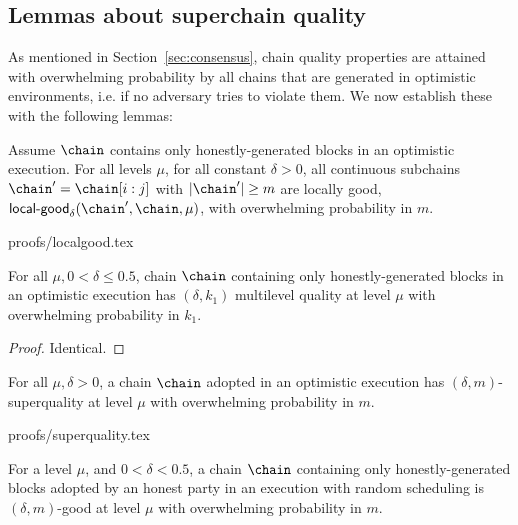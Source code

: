 \subsection{Lemmas about superchain quality}
\label{sec:consensus-full}

As mentioned in Section~\ref{sec:consensus}, chain quality properties are attained
with overwhelming probability by all chains that are generated in optimistic
environments, i.e. if no adversary tries to violate them.
We now establish these with the following lemmas:

\begin{lemma}
\label{lem.localgood}
Assume $\chain$ contains only honestly-generated blocks in an optimistic
execution. For all levels $\mu$, for all constant $\delta > 0$, all continuous
subchains $\chain' = \chain[i:j]$ with $|\chain'| \geq m$ are locally good,
$\textsf{local-good}_{\delta}(\chain', \chain, \mu)$, with overwhelming
probability in $m$.
\end{lemma}
{proofs/localgood.tex}

\begin{lemma}\label{lem.multilevel}
For all $\mu, 0 < \delta \leq 0.5$, chain $\chain$ containing only
honestly-generated blocks in an optimistic execution has $(\delta, k_1)$
multilevel quality at level $\mu$ with overwhelming probability in $k_1$.
\end{lemma}
\begin{proof}
Identical.
\Qed
\end{proof}

\begin{lemma}[Superquality]
\label{lem.superquality}
For all $\mu, \delta > 0$, a chain $\chain$ adopted in an optimistic execution
has $(\delta, m)$-superquality at level $\mu$ with overwhelming probability in
$m$.
\end{lemma}
{proofs/superquality.tex}

\begin{lemma}
\label{lem.superchain-distribution}
For a level $\mu$, and $0 < \delta < 0.5$, a chain
$\chain$ containing only honestly-generated blocks adopted by an honest party in
an execution with random scheduling is $(\delta, m)$-good at level
$\mu$ with overwhelming probability in $m$.
\end{lemma}



